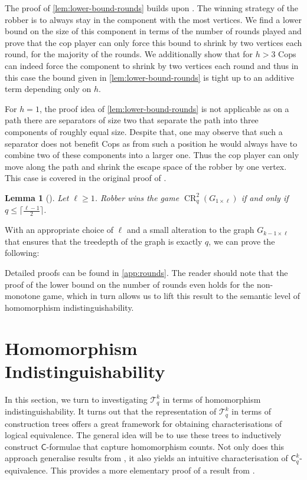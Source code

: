 \documentclass[10pt,a4paper]{article}
\newtheorem{lemma}[theorem]{Lemma}
\newcommand{\Ekq}{\ensuremath{\mathcal{T}_{q}^{k}}}
\newcommand{\lC} {\ensuremath{\mathsf C}}
\DeclareMathOperator{\CR}{CR}
\newcommand{\grid}[2]{\ensuremath{G_{#1 \times #2}}}
\begin{document}
The proof of \cref{lem:lower-bound-rounds} builds upon \cite{Furer01}.
The winning strategy of the robber is to always stay in the component with the most vertices.
We find a lower bound on the size of this component in terms of the number of rounds played and prove that the cop player can only force this bound to shrink by two vertices each round, for the majority of the rounds.
We additionally show that for $h>3$ Cops can indeed force the component to shrink by two vertices each round and thus in this case the bound given in \cref{lem:lower-bound-rounds} is tight up to an additive term depending only on $h$.

For $h=1$, the proof idea of \cref{lem:lower-bound-rounds} is not applicable as on a path there are separators of size two that separate the path into three components of roughly equal size.
Despite that, one may observe that such a separator does not benefit Cops as from such a position he would always have to combine two of these components into a larger one.
Thus the cop player can only move along the path and shrink the escape space of the robber by one vertex.
This case is covered in the original proof of \cite{Furer01}.

\begin{lemma}[{\cite[Theorems~5~and~7]{Furer01}}]
	\label{lem:rounds-path}
	Let $\ell\geq 1$. Robber wins the game $\CR_q^2(\grid{1}{\ell})$ if and only if $q\leq\lceil \frac{\ell-1}{2}\rceil$.
\end{lemma}

With an appropriate choice of $\ell$ and a small alteration to the graph \grid{k-1}{\ell} that ensures that the treedepth of the graph is exactly $q$, we can prove the following:

\ekqtwtdsyntax*

Detailed proofs can be found in \cref{app:rounds}.
The reader should note that the proof of the lower bound on the number of rounds even holds for the non-monotone game, which in turn allows us to lift this result to the semantic level of homomorphism indistinguishability.
 
\section{Homomorphism Indistinguishability} \label{sec:homind}
In this section, we turn to investigating $\Ekq$ in terms of homomorphism indistinguishability.
It turns out that the representation of $\Ekq$ in terms of construction trees offers a great framework for obtaining characterisations of logical equivalence. The general idea will be to use these trees to inductively construct $\lC$-formulae that capture homomorphism counts. Not only does this approach generalise results from \cite{dvorak_recognizing_2010,grohe_counting_2020}, it also yields an intuitive characterisation of $\lC^k_q$-equivalence. This provides a more elementary proof of a result from \cite{dawar_lovasz-type_2021}.
\end{document}
